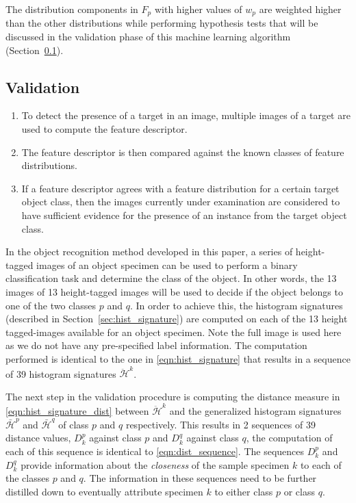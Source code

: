\documentclass {udthesis}
\begin{document}
The distribution components in $F_p$ with higher values of $w_p$ are weighted higher than the other distributions while performing hypothesis tests that will be discussed in the validation phase of this machine learning algorithm (Section~\ref{sec:distdes_validation}).

\subsection{Validation}
\label{sec:distdes_validation}

\begin{enumerate}
	\item To detect the presence of a target in an image, multiple images of a target are used to compute the feature descriptor.
	
	\item The feature descriptor is then compared against the known classes of feature distributions.
	
	\item If a feature descriptor agrees with a feature distribution for a certain target object class, then the images currently under examination are considered to have sufficient evidence for the presence of an instance from the target object class.
\end{enumerate}

In the object recognition method developed in this paper, a series of height-tagged images of an object specimen can be used to perform a binary classification task and determine the class of the object. In other words, the 13 images of 13 height-tagged images will be used to decide if the object belongs to one of the two classes $p$ and $q$. In order to achieve this, the histogram signatures (described in Section~\ref{sec:hist_signature}) are computed on each of the 13 height tagged-images available for an object specimen. Note the full image is used here as we do not have any pre-specified label information. The computation performed is identical to the one in \eqref{eqn:hist_signature} that results in a sequence of 39 histogram signatures $\ddot{\mathcal{H}}^{k}$. 

The next step in the validation procedure is computing the distance measure in \eqref{eqn:hist_signature_dist} between $\ddot{\mathcal{H}}^{k}$ and the generalized histogram signatures $\bar{\mathcal{H}}^{p}$ and $\bar{\mathcal{H}}^{q}$ of class $p$ and $q$ respectively. This results in 2 sequences of 39 distance values, $D^p_k$ against class $p$ and $D^q_k$ against class $q$, the computation of each of this sequence is identical to \eqref{eqn:dist_sequence}. The sequences $D^p_k$ and $D^q_k$ provide information about the \emph{closeness} of the sample specimen $k$ to each of the classes $p$ and $q$. The information in these sequences need to be further distilled down to eventually attribute specimen $k$ to either class $p$ or class $q$.
\end{document}
